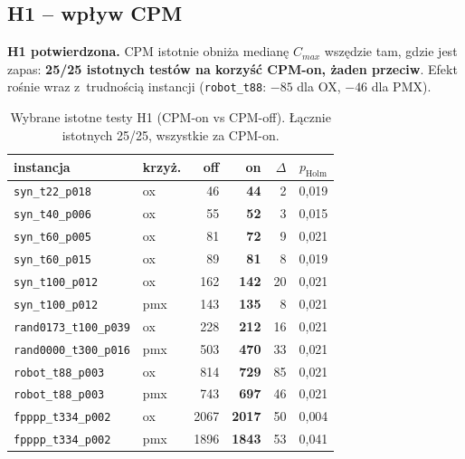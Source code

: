 \documentclass[12pt,a4paper]{article}
\begin{document}
\subsection{H1 -- wpływ CPM}
\textbf{H1 potwierdzona.} CPM istotnie obniża medianę $C_{max}$ wszędzie tam, gdzie jest zapas:
\textbf{25/25 istotnych testów na korzyść CPM-on, żaden przeciw}. Efekt rośnie wraz z~trudnością
instancji (\texttt{robot\_t88}: $-85$ dla OX, $-46$ dla PMX).

\begin{table}[H]
\centering\small\setlength{\tabcolsep}{6pt}
\begin{tabular}{llrrrc}
\toprule
instancja & krzyż. & off & on & $\Delta$ & $p_{\text{Holm}}$ \\
\midrule
\texttt{syn\_t22\_p018}       & ox  &   46 &   \textbf{44} &   2 & 0{,}019 \\
\texttt{syn\_t40\_p006}       & ox  &   55 &   \textbf{52} &   3 & 0{,}015 \\
\texttt{syn\_t60\_p005}       & ox  &   81 &   \textbf{72} &   9 & 0{,}021 \\
\texttt{syn\_t60\_p015}       & ox  &   89 &   \textbf{81} &   8 & 0{,}019 \\
\texttt{syn\_t100\_p012}      & ox  &  162 &  \textbf{142} &  20 & 0{,}021 \\
\texttt{syn\_t100\_p012}      & pmx &  143 &  \textbf{135} &   8 & 0{,}021 \\
\texttt{rand0173\_t100\_p039} & ox  &  228 &  \textbf{212} &  16 & 0{,}021 \\
\texttt{rand0000\_t300\_p016} & pmx &  503 &  \textbf{470} &  33 & 0{,}021 \\
\texttt{robot\_t88\_p003}     & ox  &  814 &  \textbf{729} &  85 & 0{,}021 \\
\texttt{robot\_t88\_p003}     & pmx &  743 &  \textbf{697} &  46 & 0{,}021 \\
\texttt{fpppp\_t334\_p002}    & ox  & 2067 & \textbf{2017} &  50 & 0{,}004 \\
\texttt{fpppp\_t334\_p002}    & pmx & 1896 & \textbf{1843} &  53 & 0{,}041 \\
\bottomrule
\end{tabular}
\caption{Wybrane istotne testy H1 (CPM-on vs CPM-off). Łącznie istotnych 25/25, wszystkie za CPM-on.}
\label{tab:h1}
\end{table}
\end{document}
